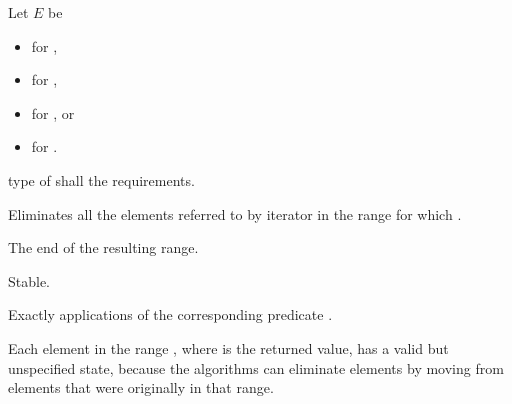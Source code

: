 \begin{itemdescr}
{\color{newclr}
\pnum
Let $E$ be
\begin{itemize}
\item {} for ,
\item {} for ,
\item {} for , or
\item {} for .
\end{itemize}
} %

\pnum
\requires
{}  type of
shall   the 
requirements.

\pnum
\effects
Eliminates all the elements referred to by iterator
in the range 
for which  .

\pnum
\returns
The end of the resulting range.

\pnum
\remarks Stable.

\pnum
\complexity
Exactly
applications of the corresponding predicate .

\pnum
\begin{note}
Each element in the range , where  is
the returned value, has a valid but unspecified state, because the algorithms
can eliminate elements by moving from elements that were originally
in that range.
\end{note}
\end{itemdescr}


